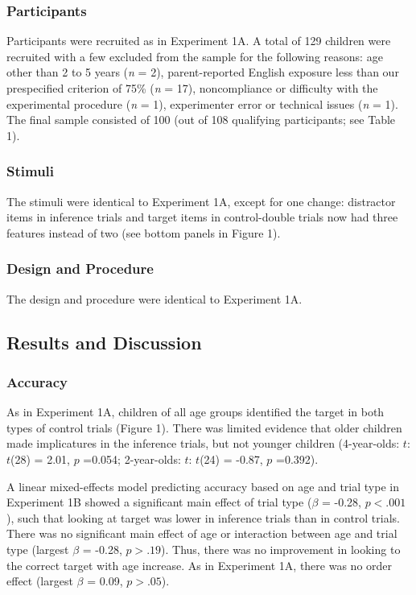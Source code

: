 \documentclass{rsos}
\begin{document}
\subsubsection{Participants}\label{participants-1}

Participants were recruited as in Experiment 1A. A total of 129 children
were recruited with a few excluded from the sample for the following
reasons: age other than 2 to 5 years (\emph{n} = 2), parent-reported
English exposure less than our prespecified criterion of 75\% (\emph{n}
= 17), noncompliance or difficulty with the experimental procedure
(\emph{n} = 1), experimenter error or technical issues (\emph{n} = 1).
The final sample consisted of 100 (out of 108 qualifying participants;
see Table 1).

\subsubsection{Stimuli}\label{stimuli}

The stimuli were identical to Experiment 1A, except for one change:
distractor items in inference trials and target items in control-double
trials now had three features instead of two (see bottom panels in
Figure 1).

\subsubsection{Design and Procedure}\label{design-and-procedure}

The design and procedure were identical to Experiment 1A.

\subsection{Results and Discussion}\label{results-and-discussion}

\subsubsection{Accuracy}\label{accuracy-1}

As in Experiment 1A, children of all age groups identified the target in
both types of control trials (Figure 1). There was limited evidence that
older children made implicatures in the inference trials, but not
younger children (4-year-olds: \(t\): \(t\)(28) = 2.01, \(p\) =0.054;
2-year-olds: \(t\): \(t\)(24) = -0.87, \(p\) =0.392).

A linear mixed-effects model predicting accuracy based on age and trial
type in Experiment 1B showed a significant main effect of trial type
(\(\beta\) = -0.28, \(p <.001\)), such that looking at target was lower
in inference trials than in control trials. There was no significant
main effect of age or interaction between age and trial type (largest
\(\beta\) = -0.28, \(p >.19\)). Thus, there was no improvement in
looking to the correct target with age increase. As in Experiment 1A,
there was no order effect (largest \(\beta\) = 0.09, \(p >.05\)).
\end{document}
